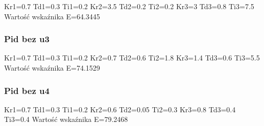 Kr1=0.7 Td1=0.3 Ti1=0.2 Kr2=3.5 Td2=0.2 Ti2=0.2 Kr3=3 Td3=0.8 Ti3=7.5
Wartość wskaźnika E=64.3445

%     

%     


\subsubsection{Pid bez u3}
Kr1=0.7 Td1=0.3 Ti1=0.2 Kr2=0.7 Td2=0.6 Ti2=1.8 Kr3=1.4 Td3=0.6 Ti3=5.5
Wartość wskaźnika E=74.1529

%     

%     


\subsubsection{Pid bez u4}
Kr1=0.7 Td1=0.3 Ti1=0.2 Kr2=0.6 Td2=0.05 Ti2=0.3 Kr3=0.8 Td3=0.4 Ti3=0.4
Wartość wskaźnika E=79.2468

%     

